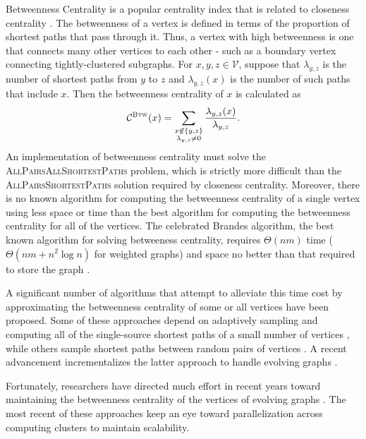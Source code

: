 \documentclass{report}
\newcommand{\algoname}[1]{\textnormal{\textsc{#1}}}
\begin{document}
Betweenness Centrality is a popular centrality index that is related to closeness centrality \cite{freeman1977set}. 
The betweenness of a vertex is defined in terms of the proportion of shortest paths that pass through it.
Thus, a vertex with high betweenness is one that connects many other vertices to each other - such as a boundary vertex connecting tightly-clustered subgraphs.
For $x,y, z \in \mathcal{V}$, suppose that $\lambda_{y,z}$ is the number of shortest paths from $y$ to $z$ and $\lambda_{y,z}(x)$ is the number of such paths that include $x$. 
Then the betweenness centrality of $x$ is calculated as
%
\begin{equation} \label{eq:bc}
\mathcal{C}^{\algoname{Btw}}(x) = \sum\limits_{\substack{x \not\in \{y,z\} \\ \lambda_{y,z} \neq 0}} \frac{\lambda_{y,z}(x)}{\lambda_{y,z}}.
\end{equation}
%
An implementation of betweenness centrality must solve the \algoname{AllPairsAllShortestPaths} problem, which is strictly more difficult than the \algoname{AllPairsShortestPaths} solution required by closeness centrality.
Moreover, there is no known algorithm for computing the betweenness centrality of a single vertex using less space or time than the best algorithm for computing the betweenness centrality for all of the vertices. 
The celebrated Brandes algorithm, the best known algorithm for solving betweeness centrality, requires $\Theta(nm)$ time ($\Theta(nm + n^2\log n)$ for weighted graphs) and space no better than that required to store the graph  \cite{brandes2001faster}. 

A significant number of algorithms that attempt to alleviate this time cost by approximating the betweenness centrality of some or all vertices have been proposed. 
Some of these approaches depend on adaptively sampling and computing all of the single-source shortest paths of a small number of vertices \cite{bader2007approximating,brandes2007centrality}, while others sample shortest paths between random pairs of vertices \cite{riondato2016fast}. 
A recent advancement incrementalizes the latter approach to handle evolving graphs \cite{bergamini2014approximating}.

Fortunately, researchers have directed much effort in recent years toward maintaining the betweenness centrality of the vertices of evolving graphs \cite{green2012fast, wei2014real, kourtellis2015scalable}. 
The most recent of these approaches keep an eye toward parallelization across computing clusters to maintain scalability.
\end{document}
